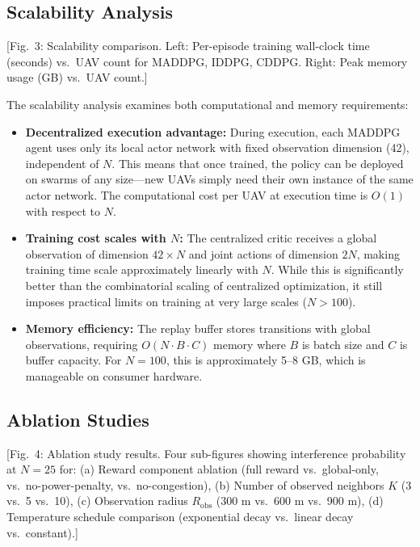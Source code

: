 \documentclass[conference]{IEEEtran}
\begin{document}
\subsection{Scalability Analysis}

[Fig.~3: Scalability comparison. Left: Per-episode training wall-clock time (seconds) vs.\ UAV count for MADDPG, IDDPG, CDDPG. Right: Peak memory usage (GB) vs.\ UAV count.]

The scalability analysis examines both computational and memory requirements:

\begin{itemize}
    \item \textbf{Decentralized execution advantage:} During execution, each MADDPG agent uses only its local actor network with fixed observation dimension (42), independent of $N$. This means that once trained, the policy can be deployed on swarms of any size---new UAVs simply need their own instance of the same actor network. The computational cost per UAV at execution time is $O(1)$ with respect to $N$.
    
    \item \textbf{Training cost scales with $N$:} The centralized critic receives a global observation of dimension $42 \times N$ and joint actions of dimension $2N$, making training time scale approximately linearly with $N$. While this is significantly better than the combinatorial scaling of centralized optimization, it still imposes practical limits on training at very large scales ($N > 100$).
    
    \item \textbf{Memory efficiency:} The replay buffer stores transitions with global observations, requiring $O(N \cdot B \cdot C)$ memory where $B$ is batch size and $C$ is buffer capacity. For $N=100$, this is approximately 5--8 GB, which is manageable on consumer hardware.
\end{itemize}

\subsection{Ablation Studies}

[Fig.~4: Ablation study results. Four sub-figures showing interference probability at $N=25$ for: (a) Reward component ablation (full reward vs.\ global-only, vs.\ no-power-penalty, vs.\ no-congestion), (b) Number of observed neighbors $K$ (3 vs.\ 5 vs.\ 10), (c) Observation radius $R_{\text{obs}}$ (300 m vs.\ 600 m vs.\ 900 m), (d) Temperature schedule comparison (exponential decay vs.\ linear decay vs.\ constant).]
\end{document}
